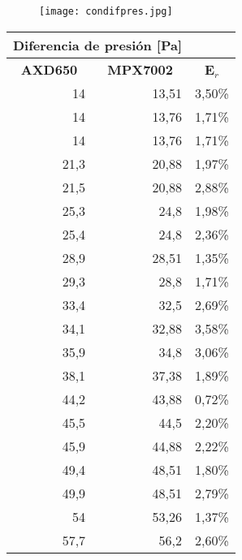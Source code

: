 \begin{figure}[H]
	\centering
	\texttt{[image: condifpres.jpg]}
	\label{fig:condifpres}
\end{figure}

\begin{table}[h!]%
		\centering
		\begin{tabular}{|r|r|r}
			\cline{1-2}
			\multicolumn{2}{|c|}{Diferencia de presión {[}Pa{]}} & \multicolumn{1}{c}{} \\ \hline
			\multicolumn{1}{|c|}{\textbf{AXD650}} & \multicolumn{1}{c|}{\textbf{MPX7002}} & \multicolumn{1}{c|}{\textbf{E$_r$}} \\ \hline
			14 & 13,51 & \multicolumn{1}{r|}{3,50\%} \\ \hline
			14 & 13,76 & \multicolumn{1}{r|}{1,71\%} \\ \hline
			14 & 13,76 & \multicolumn{1}{r|}{1,71\%} \\ \hline
			21,3 & 20,88 & \multicolumn{1}{r|}{1,97\%} \\ \hline
			21,5 & 20,88 & \multicolumn{1}{r|}{2,88\%} \\ \hline
			25,3 & 24,8 & \multicolumn{1}{r|}{1,98\%} \\ \hline
			25,4 & 24,8 & \multicolumn{1}{r|}{2,36\%} \\ \hline
			28,9 & 28,51 & \multicolumn{1}{r|}{1,35\%} \\ \hline
			29,3 & 28,8 & \multicolumn{1}{r|}{1,71\%} \\ \hline
			33,4 & 32,5 & \multicolumn{1}{r|}{2,69\%} \\ \hline
			34,1 & 32,88 & \multicolumn{1}{r|}{3,58\%} \\ \hline
			35,9 & 34,8 & \multicolumn{1}{r|}{3,06\%} \\ \hline
			38,1 & 37,38 & \multicolumn{1}{r|}{1,89\%} \\ \hline
			44,2 & 43,88 & \multicolumn{1}{r|}{0,72\%} \\ \hline
			45,5 & 44,5 & \multicolumn{1}{r|}{2,20\%} \\ \hline
			45,9 & 44,88 & \multicolumn{1}{r|}{2,22\%} \\ \hline
			49,4 & 48,51 & \multicolumn{1}{r|}{1,80\%} \\ \hline
			49,9 & 48,51 & \multicolumn{1}{r|}{2,79\%} \\ \hline
			54 & 53,26 & \multicolumn{1}{r|}{1,37\%} \\ \hline
			57,7 & 56,2 & \multicolumn{1}{r|}{2,60\%} \\ \hline

\end{tabular}
\end{table}
